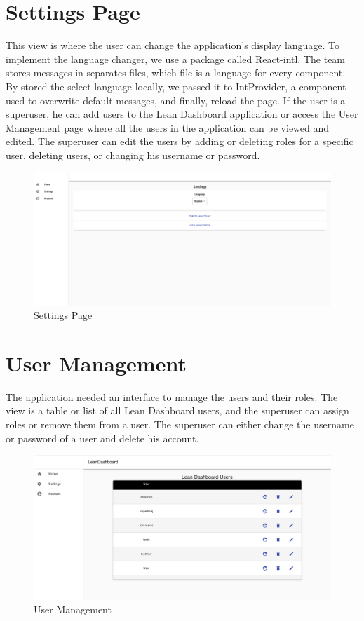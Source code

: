 \documentclass[a4paper,twoside,10pt]{report}
\begin{document}
\section{Settings Page}
This view is where the user can change the application's display language. To implement the language changer, we use a package called React-intl. The team stores messages in separates files, which file is a language for every component. 
By stored the select language locally, we passed it to IntProvider, a component used to overwrite default messages, and finally, reload the page. 
If the user is a superuser, he can add users to the Lean Dashboard application or access the User Management page where all the users in the application can be viewed and edited. The superuser can edit the users by adding or deleting roles for a specific user, deleting users, or changing his username or password. 

\begin{figure}[h!]
\center
  \includegraphics[width=\textwidth]{settingsPage.png}
\caption{Settings Page}
\end{figure}
\section{User Management}
The application needed an interface to manage the users and their roles. The view is a table or list of all Lean Dashboard users, and the superuser can assign roles or remove them from a user. The superuser can either change the username or password of a user and delete his account.
\begin{figure}[h!]
\center
  \includegraphics[width=\textwidth]{UserManagement.png}
\caption{User Management}
\end{figure}
\end{document}
